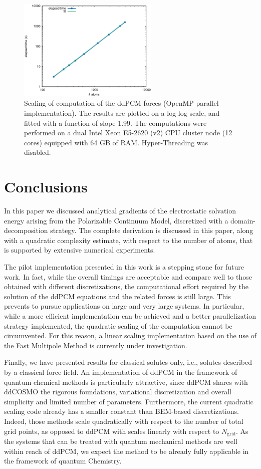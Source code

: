 \documentclass[aip,jcp,a4paper,11pt]{revtex4-1}
\begin{document}
\begin{figure}[t]
 \caption{Scaling of computation of the ddPCM forces (OpenMP parallel implementation). The results are plotted on a log-log scale, and fitted with a function of slope 1.99. The computations were performed on a dual Intel Xeon E5-2620 (v2) CPU cluster node (12 cores) equipped with 64 GB of RAM. Hyper-Threading was disabled.
\label{fig:para}}
 \includegraphics[width=0.6\textwidth]{paranew.eps}
\end{figure}


\section{Conclusions}\label{sec:conclusions}

In this paper we discussed analytical gradients of the electrostatic solvation energy arising from the Polarizable Continuum Model, discretized with a domain-decomposition strategy. The complete derivation is discussed in this paper, along with a quadratic complexity estimate, with respect to the number of atoms, that is supported by extensive numerical experiments.


The pilot implementation presented in this work is a stepping stone for future work. In fact, while the overall timings are acceptable and compare well to those obtained with different discretizations, the computational effort required by the solution of the ddPCM equations and the related forces is still large. This prevents to pursue applications on large and very large systems. In particular, while a more efficient implementation can be achieved and a better parallelization strategy implemented, the quadratic scaling of the computation cannot be circumvented. For this reason, a linear scaling implementation based on the use of the Fast Multipole Method is currently under investigation.

Finally, we have presented results for classical solutes only, i.e., solutes described by a classical force field. An implementation of ddPCM in the framework of quantum chemical methods is particularly attractive, since ddPCM shares with ddCOSMO the rigorous foundations, variational discretization and overall simplicity and limited number of parameters. Furthermore, the current quadratic scaling code already has a smaller constant than BEM-based discretizations. Indeed, those methods scale quadratically with respect to the number of total grid points, as opposed to ddPCM with scales linearly with respect to $N_\text{grid}$. As the systems that can be treated with quantum mechanical methods are well within reach of ddPCM, we expect the method to be already fully applicable in the framework of quantum Chemistry. 
\end{document}

